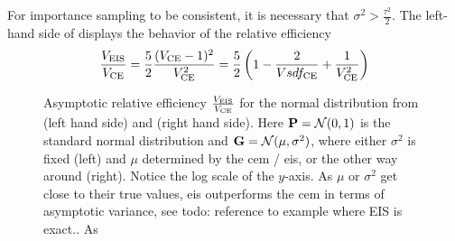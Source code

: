 \begin{example}
    For importance sampling to be consistent, it is necessary that $\sigma^{2} > \frac{\tau^{2}}{2}$. The left-hand side of  displays the behavior of the relative efficiency
    $$
    \frac{V_{\eis}}{V_{\ce}} = \frac{5}{2} \frac{(V_{\ce} - 1)^{2}}{V_{\ce}^{2}} = \frac{5}{2} \left( 1 - \frac{2}{Vsdf_{\ce}} + \frac{1}{V_{\ce}^2} \right)
    $$

    \begin{figure}
        \centering

        \begin{subfigure}{.49\textwidth}
            \resizebox{\textwidth}{!}{%
            }
        \end{subfigure}
        \begin{subfigure}{.49\textwidth}
            \resizebox{\textwidth}{!}{%
            }
        \end{subfigure}
        \label{fig:normal_are}
        \caption{Asymptotic relative efficiency $\frac{V_{\eis}}{V_{\ce}}$ for the normal distribution from  (left hand side) and  (right hand side). Here $\P = \mathcal N(0, 1)$ is the standard normal distribution and $\G = \mathcal N(\mu, \sigma^{2})$, where either $\sigma^{2}$ is fixed (left) and $\mu$ determined by the \gls{cem} / \gls{eis}, or the other way around (right). Notice the log scale of the $y$-axis. As $\mu$ or $\sigma^{2}$ get close to their true values, \gls{eis} outperforms the \gls{cem} in terms of asymptotic variance, see {\color{red} todo:  reference to example where EIS is exact.}. As}
    \end{figure}
    

    

\end{example}
